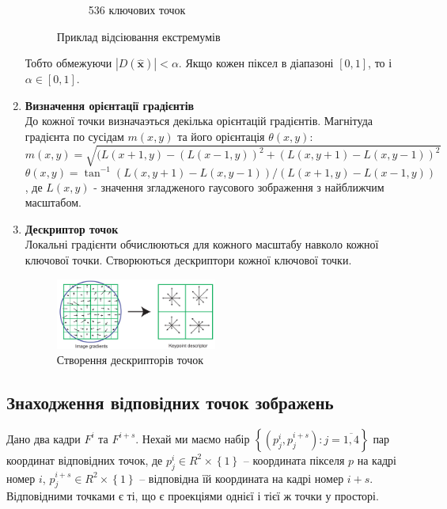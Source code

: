 \begin{enumerate}
\begin{figure}[H]
\begin{subfigure}[c]{0.3\textwidth}
                \caption{ 536 ключових точок
                \label{fig:swift5}
                }
            \end{subfigure}
            \caption{Приклад відсіювання екстремумів
            \label{fig:sift45}
            }
        \end{figure}
        Тобто обмежуючи $|D(\widehat{\textbf{x}})| < \alpha$. Якщо кожен піксел в діапазоні $[0,1]$, то і 
        $ \alpha \in [0,1]$.
    \item \textbf{Визначення орієнтації градієнтів} \\
        До кожної точки визначаэться декілька орієнтацій градієнтів.
        Магнітуда градієнта по сусідам $m(x,y)$ та його орієнтація $\theta(x,y)$:
        \begin{equation}
            m(x,y) = \sqrt{(L(x+1,y) - (L(x-1,y))^2 + (L(x,y+1) - L(x,y-1))^2}
        \end{equation}
        \begin{equation}
        \theta(x,y) = \tan^{-1} (L(x,y+1) - L(x,y-1))/(L(x+1,y) - L(x-1,y))
        \end{equation}
        , де $L(x,y)$ - значення згладженого гаусового зображення з найближчим масштабом.

    \item \textbf{Дескриптор точок} \\
        Локальні градієнти обчислюються для кожного масштабу навколо кожної ключової точки.
        Створюються дескриптори кожної ключової точки.
        \begin{figure}[H]
            \centering
            \includegraphics[width=0.5\textwidth]{images/sift6}
            \caption{Створення дескрипторів точок}
            \label{fig:swift6}
        \end{figure}
\end{enumerate}

\subsection{Знаходження відповідних точок зображень}

Дано два кадри \(F^{i}\) та \(F^{i + s}\). Нехай ми маємо набір
\(\left\{ \left( p_{j}^{i},p_{j}^{i + s} \right):j = \overline{1,4} \right\}\)
пар координат відповідних точок, де
\(p_{j}^{i} \in R^{2} \times \left\{ 1 \right\}\) -- координата пікселя
\(p\) на кадрі номер \(i\),
\(p_{j}^{i + s} \in R^{2} \times \left\{ 1 \right\}\) -- відповідна їй
координата на кадрі номер \(i + s\). Відповідними точками є ті, що є
проекціями однієї і тієї ж точки у просторі.

